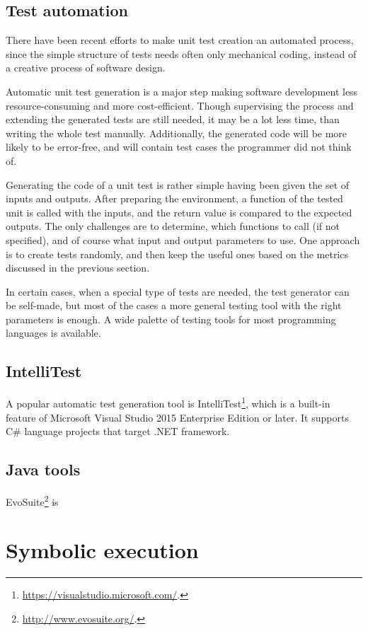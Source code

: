 \subsection{Test automation}

There have been recent efforts to make unit test creation an automated process, since the simple structure of tests needs often only mechanical coding, instead of a creative process of software design. 

Automatic unit test generation is a major step making software development less resource-consuming and more cost-efficient. Though supervising the process and extending the generated tests are still needed, it may be a lot less time, than writing the whole test manually. Additionally, the generated code will be more likely to be error-free, and will contain test cases the programmer did not think of.

Generating the code of a unit test is rather simple having been given the set of inputs and outputs. After preparing the environment, a function of the tested unit is called with the inputs, and the return value is compared to the expected outputs. The only challenges are to determine, which functions to call (if not specified), and of course what input and output parameters to use. One approach is to create tests randomly, and then keep the useful ones based on the metrics discussed in the previous section.

In certain cases, when a special type of tests are needed, the test generator can be self-made, but most of the cases a more general testing tool with the right parameters is enough. A wide palette of testing tools for most programming languages is available. 

\subsection{IntelliTest}
A popular automatic test generation tool is IntelliTest\footnote{\url{https://visualstudio.microsoft.com/}.}, which is a built-in feature of Microsoft Visual Studio 2015 Enterprise Edition or later. \cite{intellitest_manual}
It supports C\# language projects that target .NET framework. 
\subsection{Java tools}
EvoSuite\footnote{\url{http://www.evosuite.org/}.} is  \cite{aron_autom}
\section{Symbolic execution}

